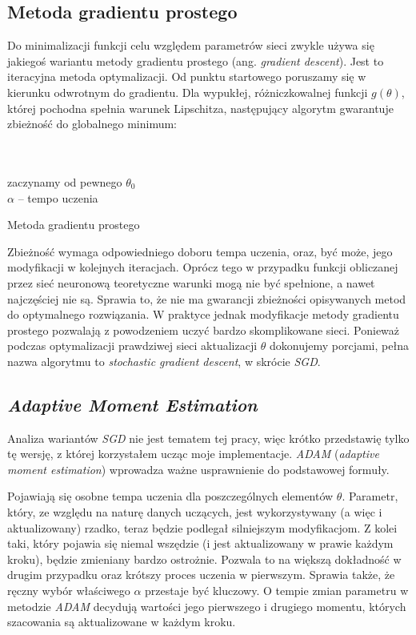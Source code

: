 \subsection{Metoda gradientu prostego}
Do minimalizacji funkcji celu względem parametrów sieci zwykle używa się jakiegoś wariantu metody gradientu prostego (ang. \textit{gradient descent}). Jest to iteracyjna metoda optymalizacji. Od punktu startowego poruszamy się w kierunku odwrotnym do gradientu. Dla wypukłej, różniczkowalnej funkcji $g(\theta)$, której pochodna spełnia warunek Lipschitza, następujący algorytm gwarantuje zbieżność do globalnego minimum:
\\[.5cm]
\begin{algorithm}[H]
    \\\\zaczynamy od pewnego $\theta_0$\\
    $\alpha$ -- tempo uczenia\\[5pt]
    \caption{Metoda gradientu prostego}
\end{algorithm}

\vspace{.5cm}

Zbieżność wymaga odpowiedniego doboru tempa uczenia, oraz, być może, jego modyfikacji w kolejnych iteracjach. Oprócz tego w przypadku funkcji obliczanej przez sieć neuronową teoretyczne warunki mogą nie być spełnione, a nawet najczęściej nie są. Sprawia to, że nie ma gwarancji zbieżności opisywanych metod do optymalnego rozwiązania. W praktyce jednak modyfikacje metody gradientu prostego pozwalają z powodzeniem uczyć bardzo skomplikowane sieci. Ponieważ podczas optymalizacji prawdziwej sieci aktualizacji $\theta$ dokonujemy porcjami, pełna nazwa algorytmu to \textit{stochastic gradient descent}, w skrócie \textit{SGD}.

\subsection{\textit{Adaptive Moment Estimation}} \label{adam}
Analiza wariantów \textit{SGD} nie jest tematem tej pracy, więc krótko przedstawię tylko tę wersję, z której korzystałem ucząc moje implementacje. \textit{ADAM} (\textit{adaptive moment estimation}) \cite{adam} wprowadza ważne usprawnienie do podstawowej formuły.

Pojawiają się osobne tempa uczenia dla poszczególnych elementów $\theta$. Parametr, który, ze względu na naturę danych uczących, jest wykorzystywany (a więc i aktualizowany) rzadko, teraz będzie podlegał silniejszym modyfikacjom. Z kolei taki, który pojawia się niemal wszędzie (i jest aktualizowany w prawie każdym kroku), będzie zmieniany bardzo ostrożnie. Pozwala to na większą dokładność w drugim przypadku oraz krótszy proces uczenia w pierwszym. Sprawia także, że ręczny wybór właściwego $\alpha$ przestaje być kluczowy. O tempie zmian parametru w metodzie \textit{ADAM} decydują wartości jego pierwszego i drugiego momentu, których szacowania są aktualizowane w każdym kroku.

